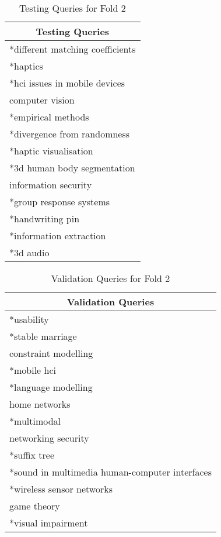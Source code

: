 \begin{table}
\centering
\begin{tabular}{|l|}
\hline \multicolumn{1}{|c|}{\textbf{Testing Queries}} \\
\hline *different matching coefficients \\
\hline *haptics \\
\hline *hci issues in mobile devices \\
\hline computer vision \\ 
\hline *empirical methods \\
\hline *divergence from randomness \\ 
\hline *haptic visualisation \\
\hline *3d human body segmentation \\ 
\hline information security \\
\hline *group response systems \\ 
\hline *handwriting pin \\
\hline *information extraction \\ 
\hline *3d audio \\
\hline
\end{tabular}
\caption{Testing Queries for Fold 2} \label{table:fold2testing}
\end{table}

\begin{table}
\centering
\begin{tabular}{|l|}
\hline \multicolumn{1}{|c|}{\textbf{Validation Queries}} \\
\hline *usability \\
\hline *stable marriage \\
\hline constraint modelling \\
\hline *mobile hci \\ 
\hline *language modelling \\
\hline home networks \\ 
\hline *multimodal \\
\hline networking security \\ 
\hline *suffix tree \\
\hline *sound in multimedia human-computer interfaces \\ 
\hline *wireless sensor networks \\
\hline game theory \\ 
\hline *visual impairment \\
\hline
\end{tabular}
\caption{Validation Queries for Fold 2} \label{table:fold2validating}
\end{table}

